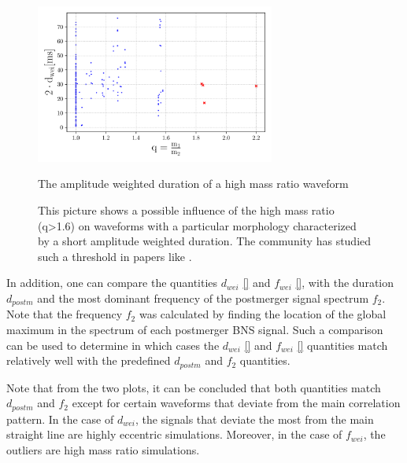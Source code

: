 \begin{figure}[hbt!]
\begin{center}
\includegraphics[width=0.7\textwidth, angle=0]{images/Data_analysis/results/Mr.pdf}
\captionsetup{width=0.8\textwidth}
\caption{The amplitude weighted duration of a high mass ratio waveform}
\caption*{This picture shows a possible influence of the high mass ratio (q>1.6) on waveforms with a particular morphology characterized by a  short amplitude weighted duration. The community has studied such a threshold in papers like \cite{Kolsch:2021lub}.}
\label{High mass ratio}
\end{center}
\end{figure}
\FloatBarrier


In addition, one can compare the quantities $d_{wei}$ \ref{} and $f_{wei}$ \ref{}, with the duration $d_{postm}$ and the most dominant frequency of the postmerger signal spectrum $f_2$. Note that the frequency $f_2$ was calculated by finding the location of the global maximum in the spectrum of each postmerger BNS signal. Such a comparison can be used to determine in which cases the $d_{wei}$ \ref{} and $f_{wei}$ \ref{} quantities match relatively well with the predefined $d_{postm}$ and $f_2$ quantities.

Note that from the two plots, it can be concluded that both quantities match $d_{postm}$ and $f_2$ except for certain waveforms that deviate from the main correlation pattern. In the case of $d_{wei}$, the signals that deviate the most from the main straight line are highly eccentric simulations. Moreover, in the case of $f_{wei}$, the outliers are high mass ratio simulations.

